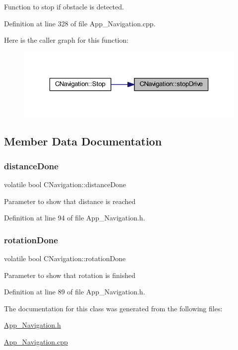 Function to stop if obstacle is detected. 



Definition at line 328 of file App\+\_\+\+Navigation.\+cpp.

Here is the caller graph for this function\+:\nopagebreak
\begin{figure}[H]
\begin{center}
\leavevmode
\includegraphics[width=323pt]{class_c_navigation_a06ce71124d487f1f9febf36a0e4b2a5d_icgraph}
\end{center}
\end{figure}


\subsection{Member Data Documentation}
\mbox{\label{class_c_navigation_af3f718b7aa00a149c31c5682113da75e}} 
\subsubsection{\texorpdfstring{distanceDone}{distanceDone}}
{\footnotesize\ttfamily volatile bool C\+Navigation\+::distance\+Done}

Parameter to show that distance is reached 

Definition at line 94 of file App\+\_\+\+Navigation.\+h.

\mbox{\label{class_c_navigation_a069e02947303fed95655cd4ad88a96b7}} 
\subsubsection{\texorpdfstring{rotationDone}{rotationDone}}
{\footnotesize\ttfamily volatile bool C\+Navigation\+::rotation\+Done}

Parameter to show that rotation is finished 

Definition at line 89 of file App\+\_\+\+Navigation.\+h.



The documentation for this class was generated from the following files\+:\begin{DoxyCompactItemize}
\item 
\mbox{\hyperlink{_app___navigation_8h}{App\+\_\+\+Navigation.\+h}}\item 
\mbox{\hyperlink{_app___navigation_8cpp}{App\+\_\+\+Navigation.\+cpp}}\end{DoxyCompactItemize}
